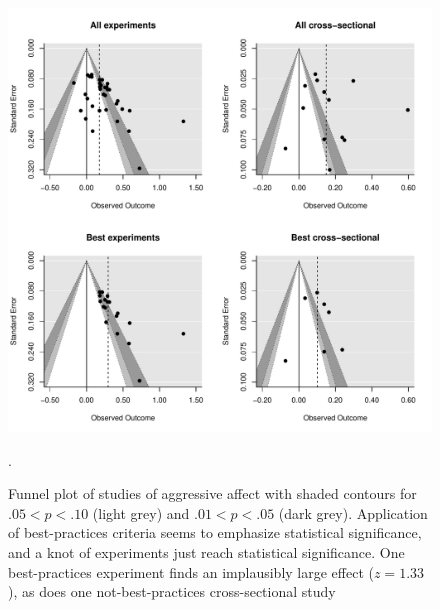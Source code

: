 \documentclass[jou]{apa6}
\begin{document}
\begin{figure}
	\includegraphics[width = \textwidth, keepaspectratio]{funnels-0_AggAff.pdf}
	\caption{Funnel plot of studies of aggressive affect with shaded contours for $.05 < p < .10$ (light grey) and $.01 < p < .05$ (dark grey). Application of best-practices criteria seems to emphasize statistical significance, and a knot of experiments just reach statistical significance. One best-practices experiment \citep{Ballard:Wiest:1996} finds an implausibly large effect ($z = 1.33$), as does one not-best-practices cross-sectional study \citep[$z = 0.60$]{Urashima:Suzuki:2003}}.
	\label{funnel-aggaff}
\end{figure}
\end{document}

